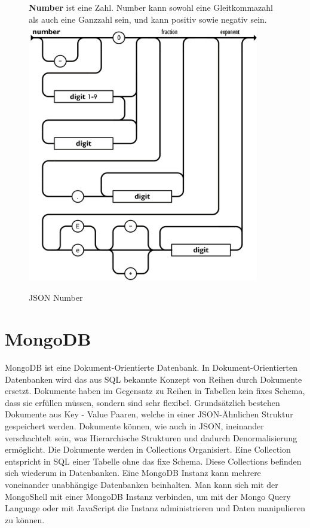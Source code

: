 \begin{figure}[H]
    \begin{minipage}[t]{0.45\textwidth}
        \textbf{Number} ist eine Zahl.
        Number kann sowohl eine Gleitkommazahl als auch eine Ganzzahl sein, und kann positiv sowie negativ sein.
        \includegraphics[width=0.9\textwidth]{images/json_number}
        \caption{JSON Number}
        \label{fig:json_number}
    \end{minipage}\hfill
\end{figure}

\section{MongoDB}
\label{sec:mongodb}

MongoDB ist eine Dokument-Orientierte Datenbank. 
In Dokument-Orientierten Datenbanken wird das aus SQL bekannte Konzept von Reihen durch Dokumente ersetzt.
Dokumente haben im Gegensatz zu Reihen in Tabellen kein fixes Schema, dass sie erfüllen müssen, sondern sind sehr flexibel.
Grundsätzlich bestehen Dokumente aus Key - Value Paaren, welche in einer JSON-Ähnlichen Struktur gespeichert werden.
Dokumente können, wie auch in JSON, ineinander verschachtelt sein, was Hierarchische Strukturen und dadurch Denormalisierung ermöglicht.
Die Dokumente werden in Collections Organisiert.
Eine Collection entspricht in SQL einer Tabelle ohne das fixe Schema.
Diese Collections befinden sich wiederum in Datenbanken.
Eine MongoDB Instanz kann mehrere voneinander unabhängige Datenbanken beinhalten.
Man kann sich mit der MongoShell mit einer MongoDB Instanz verbinden, um mit der Mongo Query Language oder mit JavaScript die Instanz administrieren und Daten manipulieren zu können.
~\autocite{bradshaw:mongodb}

